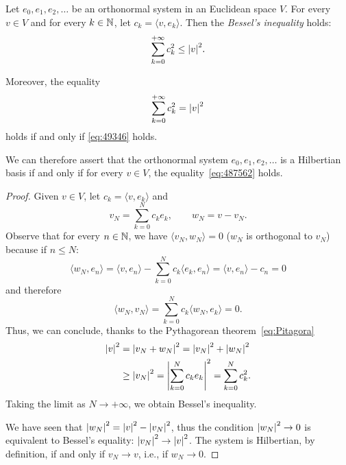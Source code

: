 \begin{theorem}
\label{th:bessel}%
Let $e_0, e_1, e_2, \dots$ be an orthonormal system in an Euclidean space $V$.
For every $v\in V$ and for every $k\in {\mathbb N}$, let $c_k = \langle v,e_k\rangle$.
Then the \emph{Bessel's inequality}%
 holds:
\begin{equation}\label{eq:disuguaglianza_Bessel}
\sum_{k=0}^{+\infty} c_k^2 \le {\left|v\right|}^2.
\end{equation}

Moreover, the equality
\begin{equation}\label{eq:487562}
\sum_{k=0}^{+\infty} c_k^2 = {\left|v\right|}^2
\end{equation}
holds if and only if \eqref{eq:49346} holds.

We can therefore assert that the orthonormal system $e_0, e_1, e_2, \dots$ is a
Hilbertian basis if and only if for every $v\in V$, the
equality~\eqref{eq:487562} holds.
\end{theorem}
%
\begin{proof}
Given $v\in V$, let $c_k = \langle v,e_k\rangle$ and
\[
   v_N = \sum_{k=0}^N c_k e_k, \qquad w_N = v - v_N.
\]
Observe that for every $n\in {\mathbb N}$, we have $\langle v_N,w_N\rangle=0$ ($w_N$ is
orthogonal to $v_N$) because if $n\le N$:
\[
  \langle w_N , e_n \rangle
  = \langle v, e_n\rangle - \sum_{k=0}^N c_k \langle e_k, e_n\rangle
  = \langle v,e_n\rangle - c_n = 0
\]
and therefore
\[
 \langle w_N, v_N \rangle = \sum_{k=0}^N c_k \langle w_N, e_k\rangle = 0.
\]
Thus, we can conclude, thanks to the Pythagorean theorem~\eqref{eq:Pitagora}
\begin{align*}
  {\left|v\right|}^2
  &= {\left|v_N + w_N\right|}^2
  = {\left|v_N\right|}^2 + {\left|w_N\right|}^2 \\
  &\ge {\left|v_N\right|}^2 = {\left|\sum_{k=0}^N c_k e_k\right|}^2
  = \sum_{k=0}^N c_k^2.
\end{align*}
Taking the limit as $N\to +\infty$, we obtain Bessel's inequality.

We have seen that ${\left|w_N\right|}^2 = {\left|v\right|}^2 - {\left|v_N\right|}^2$, thus the condition
${\left|w_N\right|}^2\to 0$ is equivalent to Bessel's equality: ${\left|v_N\right|}^2 \to
{\left|v\right|}^2$. The system is Hilbertian, by definition, if and only if $v_N \to v$,
i.e., if $w_N\to 0$.
\end{proof}

